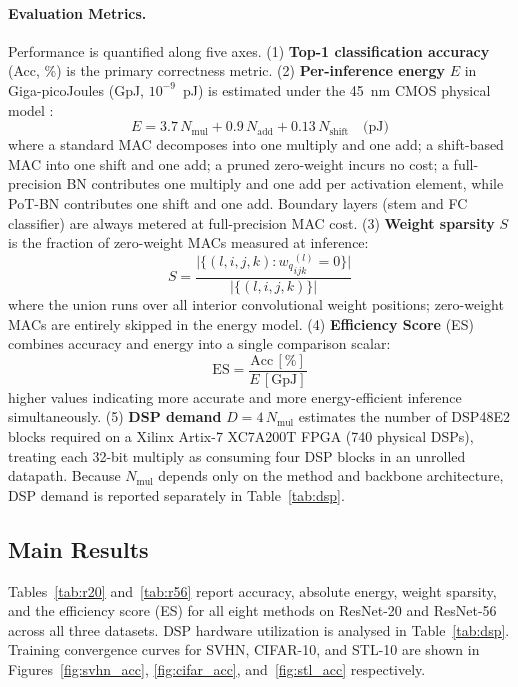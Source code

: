 \documentclass[12pt]{article}
\begin{document}
\paragraph{Evaluation Metrics.} Performance is quantified along five axes. (1) \textbf{Top-1 classification accuracy} (Acc, \%) is the primary correctness metric. (2) \textbf{Per-inference energy} $E$ in Giga-picoJoules (GpJ, $10^{-9}$~pJ) is estimated under the 45~nm CMOS physical model \cite{chen2020adder,horowitz2014energy}:
\begin{equation*}
    E = 3.7\,N_\text{mul} + 0.9\,N_\text{add} + 0.13\,N_\text{shift} \quad \text{(pJ)}
\end{equation*}
where a standard MAC decomposes into one multiply and one add; a shift-based MAC into one shift and one add; a pruned zero-weight incurs no cost; a full-precision BN contributes one multiply and one add per activation element, while PoT-BN contributes one shift and one add. Boundary layers (stem and FC classifier) are always metered at full-precision MAC cost. (3) \textbf{Weight sparsity} $S$ is the fraction of zero-weight MACs measured at inference:
\begin{equation*}
    S = \frac{\bigl|\bigl\{(l,i,j,k) : {w_q}^{(l)}_{ijk} = 0\bigr\}\bigr|}{\bigl|\bigl\{(l,i,j,k)\bigr\}\bigr|}
\end{equation*}
where the union runs over all interior convolutional weight positions; zero-weight MACs are entirely skipped in the energy model. (4) \textbf{Efficiency Score} (ES) combines accuracy and energy into a single comparison scalar:
\begin{equation*}
    \text{ES} = \frac{\text{Acc}\,[\%]}{E\,[\text{GpJ}]}
\end{equation*}
higher values indicating more accurate and more energy-efficient inference simultaneously. (5) \textbf{DSP demand} $D = 4\,N_\text{mul}$ estimates the number of DSP48E2 blocks required on a Xilinx Artix-7 XC7A200T FPGA (740 physical DSPs), treating each 32-bit multiply as consuming four DSP blocks in an unrolled datapath. Because $N_\text{mul}$ depends only on the method and backbone architecture, DSP demand is reported separately in Table~\ref{tab:dsp}.

\subsection{Main Results}

Tables~\ref{tab:r20} and~\ref{tab:r56} report accuracy, absolute energy, weight sparsity, and the efficiency score (ES) for all eight methods on ResNet-20 and ResNet-56 across all three datasets. DSP hardware utilization is analysed in Table~\ref{tab:dsp}. Training convergence curves for SVHN, CIFAR-10, and STL-10 are shown in Figures~\ref{fig:svhn_acc}, \ref{fig:cifar_acc}, and~\ref{fig:stl_acc} respectively.
\end{document}
